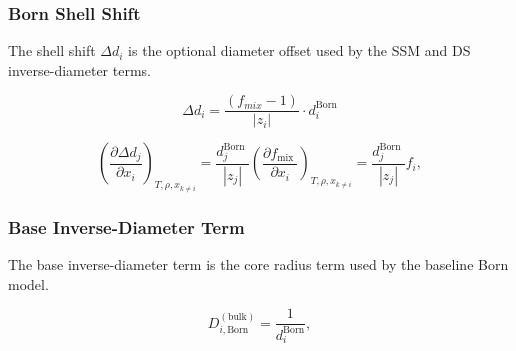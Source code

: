 \documentclass[12pt, letterpaper]{article}
\begin{document}
\subsubsection{Born Shell Shift}

The shell shift \(\Delta d_i\) is the optional diameter offset used by the SSM and DS inverse-diameter terms.

\begin{equation}
    \Delta d_{i}=\frac{(f_{mix}-1)}{|z_{i}|}\cdot d_{i}^{\mathrm{Born}}
    \label{eq:delta_d_born}
\end{equation}


\begin{equation}
    \left(\frac{\partial \Delta d_{j}}{\partial x_{i}}\right)_{T,\rho,x_{k\neq i}}
    =\frac{d_{j}^{\text {Born }}}{\left|z_{j}\right|} \left(\frac{\partial f_{\text {mix }}}{\partial x_{i}}\right)_{T,\rho,x_{k\neq i}}
    =\frac{d_{j}^{\text {Born }}}{\left|z_{j}\right|} f_{i},
    \label{eq:ddelta_d_dxi}
\end{equation}

\subsubsection{Base Inverse-Diameter Term}

The base inverse-diameter term is the core radius term used by the baseline Born model.

\begin{equation}
D_{i,\mathrm{Born}}^{(\mathrm{bulk})}
=
\frac{1}{d_i^{\mathrm{Born}}},
\label{eq:D_born}
\end{equation}
\end{document}
